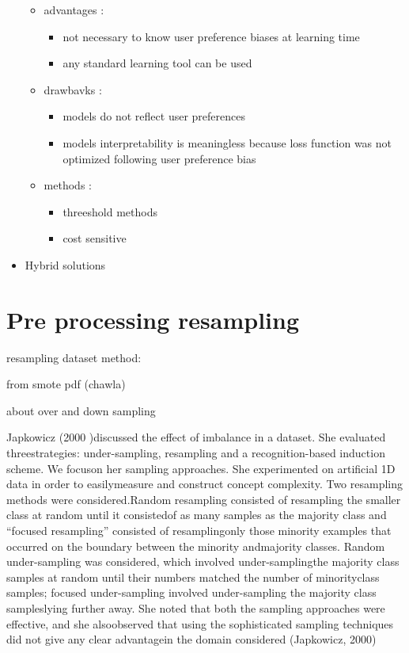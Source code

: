 \documentclass[
]{report}
\providecommand{\tightlist}{%
  \setlength{\itemsep}{0pt}\setlength{\parskip}{0pt}}
\begin{document}
\begin{itemize}
  \begin{itemize}
  \tightlist
  \item
    advantages :

    \begin{itemize}
    \tightlist
    \item
      not necessary to know user preference biases at learning time
    \item
      any standard learning tool can be used
    \end{itemize}
  \item
    drawbavks :

    \begin{itemize}
    \tightlist
    \item
      models do not reflect user preferences
    \item
      models interpretability is meaningless because loss function was not optimized following user preference bias
    \end{itemize}
  \item
    methods :

    \begin{itemize}
    \tightlist
    \item
      threeshold methods
    \item
      cost sensitive
    \end{itemize}
  \end{itemize}
\item
  Hybrid solutions
\end{itemize}

\hypertarget{pre-processing-resampling}{%
\section{Pre processing resampling}\label{pre-processing-resampling}}

resampling dataset method:

from smote pdf (chawla)

about over and down sampling

Japkowicz (2000 )discussed the effect of imbalance in a dataset. She evaluated threestrategies: under-sampling, resampling and a recognition-based induction scheme. We focuson her sampling approaches. She experimented on artificial 1D data in order to easilymeasure and construct concept complexity. Two resampling methods were considered.Random resampling consisted of resampling the smaller class at random until it consistedof as many samples as the majority class and ``focused resampling'' consisted of resamplingonly those minority examples that occurred on the boundary between the minority andmajority classes. Random under-sampling was considered, which involved under-samplingthe majority class samples at random until their numbers matched the number of minorityclass samples; focused under-sampling involved under-sampling the majority class sampleslying further away. She noted that both the sampling approaches were effective, and she alsoobserved that using the sophisticated sampling techniques did not give any clear advantagein the domain considered (Japkowicz, 2000)
\end{document}
